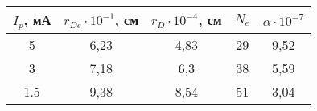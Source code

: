 \begin{table}[h!]
    \centering
    \begin{tabular}{|c|c|c|c|c|}
    \hline
    $I_p$, мА & $r_{De} \cdot 10^{-1}$, см & $r_D \cdot 10^{-4}$, см & $N_e$ & $\alpha \cdot 10^{-7}$ \\ \hline
    5         & 6,23                       & 4,83                    & 29    & 9,52                   \\ \hline
    3         & 7,18                       & 6,3                     & 38    & 5,59                   \\ \hline
    1.5       & 9,38                       & 8,54                    & 51    & 3,04                   \\ \hline
    \end{tabular}
\end{table}